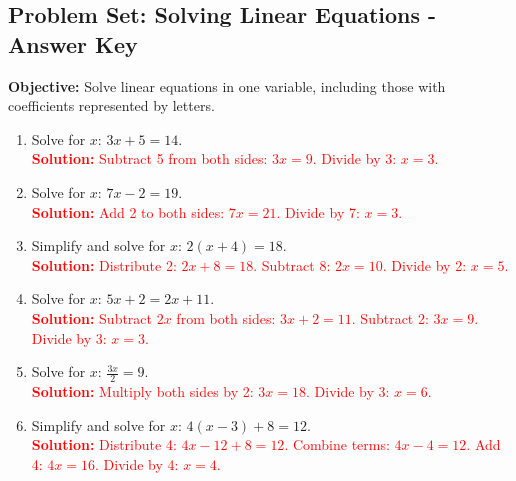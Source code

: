 \documentclass[11pt]{article}
\title{}
\date{}
\begin{document}
\subsection*{Problem Set: Solving Linear Equations - Answer Key}
\onehalfspacing

\begin{tcolorbox}[colframe=black!40, colback=gray!5, 
coltitle=black, colbacktitle=black!20, fonttitle=\bfseries\Large, 
title=Learning Objective, halign title=center, left=5pt, right=5pt, top=5pt, bottom=15pt]
\textbf{Objective:} Solve linear equations in one variable, including those with coefficients represented by letters.
\end{tcolorbox}

\begin{tcolorbox}[colframe=black!60, colback=white, 
coltitle=black, colbacktitle=black!15, fonttitle=\bfseries\Large, 
title=Exercises, halign title=center, left=10pt, right=10pt, top=10pt, bottom=20pt]
\begin{enumerate}[itemsep=1em]
    \item Solve for \(x\): \( 3x + 5 = 14 \).\\
    \textcolor{red}{\textbf{Solution:} Subtract 5 from both sides: \(3x = 9\). Divide by 3: \(x = 3\).}

    \item Solve for \(x\): \( 7x - 2 = 19 \).\\
    \textcolor{red}{\textbf{Solution:} Add 2 to both sides: \(7x = 21\). Divide by 7: \(x = 3\).}

    \item Simplify and solve for \(x\): \( 2(x + 4) = 18 \).\\
    \textcolor{red}{\textbf{Solution:} Distribute 2: \(2x + 8 = 18\). Subtract 8: \(2x = 10\). Divide by 2: \(x = 5\).}

    \item Solve for \(x\): \( 5x + 2 = 2x + 11 \).\\
    \textcolor{red}{\textbf{Solution:} Subtract \(2x\) from both sides: \(3x + 2 = 11\). Subtract 2: \(3x = 9\). Divide by 3: \(x = 3\).}

    \item Solve for \(x\): \( \frac{3x}{2} = 9 \).\\
    \textcolor{red}{\textbf{Solution:} Multiply both sides by 2: \(3x = 18\). Divide by 3: \(x = 6\).}

    \item Simplify and solve for \(x\): \( 4(x - 3) + 8 = 12 \).\\
    \textcolor{red}{\textbf{Solution:} Distribute 4: \(4x - 12 + 8 = 12\). Combine terms: \(4x - 4 = 12\). Add 4: \(4x = 16\). Divide by 4: \(x = 4\).}


\end{enumerate}
\end{tcolorbox}
\end{document}
